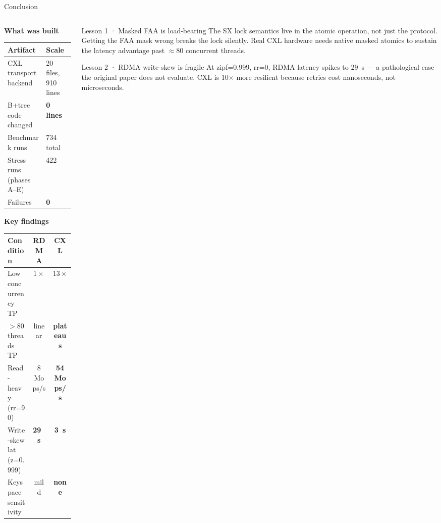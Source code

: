 \documentclass[aspectratio=169,8pt]{beamer}
\newcommand{\good}[1]{\textcolor{green!50!black}{\textbf{#1}}}
\newcommand{\bad}[1]{\textcolor{red!70!black}{\textbf{#1}}}
\begin{document}
\begin{frame}{Conclusion}

\begin{columns}[T,onlytextwidth]
\begin{column}{0.48\textwidth}

\textbf{What was built}\\[0.3em]
{\small
\begin{tabular}{ll}
\toprule
Artifact & Scale \\
\midrule
CXL transport backend & 20 files, 910 lines \\
B+tree code changed & \good{0 lines} \\
Benchmark runs & 734 total \\
Stress runs (phases A--E) & 422 \\
Failures & \good{0} \\
\bottomrule
\end{tabular}
}

\vspace{0.6em}
\textbf{Key findings}\\[0.3em]
{\small
\begin{tabular}{lcc}
\toprule
Condition & RDMA & CXL \\
\midrule
Low concurrency TP & $1\times$ & \good{$13\times$} \\
$>$80 threads TP & linear & \bad{plateaus} \\
Read-heavy (rr=90) & 8 Mops/s & \good{54 Mops/s} \\
Write-skew lat (z=0.999) & \bad{29~\textmu{}s} & \good{3~\textmu{}s} \\
Keyspace sensitivity & mild & \good{none} \\
\bottomrule
\end{tabular}
}

\end{column}
\begin{column}{0.50\textwidth}

\begin{block}{Lesson 1 · Masked FAA is load-bearing}
\small The SX lock semantics live in the atomic operation, not just the protocol. Getting the FAA mask wrong breaks the lock silently. Real CXL hardware needs native masked atomics to sustain the latency advantage past $\approx$80 concurrent threads.
\end{block}

\vspace{0.3em}
\begin{block}{Lesson 2 · RDMA write-skew is fragile}
\small At zipf=0.999, rr=0, RDMA latency spikes to 29~\textmu{}s — a pathological case the original paper does not evaluate. CXL is 10$\times$ more resilient because retries cost nanoseconds, not microseconds.
\end{block}


\end{column}
\end{columns}
\end{frame}
\end{document}

